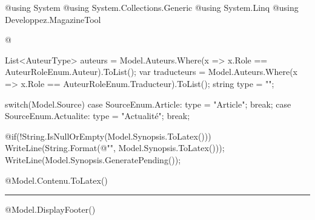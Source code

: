 @using System
@using System.Collections.Generic
@using System.Linq
@using Developpez.MagazineTool

@{
	List<AuteurType> auteurs = Model.Auteurs.Where(x => x.Role == AuteurRoleEnum.Auteur).ToList();
	var traducteurs = Model.Auteurs.Where(x => x.Role == AuteurRoleEnum.Traducteur).ToList();
	string type = "";

	switch(Model.Source)
	{
		case SourceEnum.Article:
			type = "Article";
			break;
		case SourceEnum.Actualite:
			type = "Actualité";
			break;
	}
}
\begin{sloppypar}
\label{article-@Model.ID}
\end{sloppypar}

@if(!String.IsNullOrEmpty(Model.Synopsis.ToLatex()))
{
	WriteLine(String.Format(@"", Model.Synopsis.ToLatex()));
	WriteLine(Model.Synopsis.GeneratePending());
}


@Model.Contenu.ToLatex()

\begin{center}
\rule{\linewidth}{.5pt}
\end{center}

@Model.DisplayFooter()
